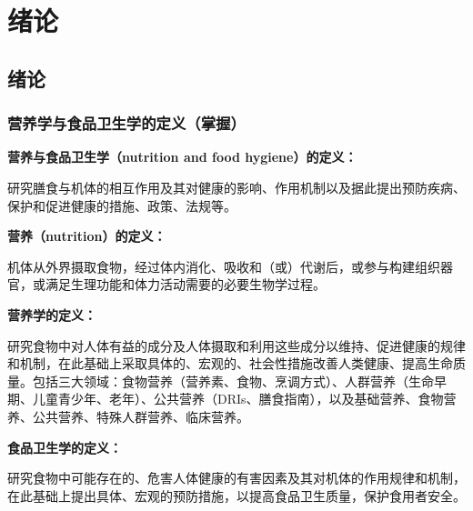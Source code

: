 \chapter{绪论}

\section{绪论}

\subsection{营养学与食品卫生学的定义（掌握）}

\begin{keybox}
\textbf{营养与食品卫生学（nutrition and food hygiene）的定义：}

研究膳食与机体的相互作用及其对健康的影响、作用机制以及据此提出预防疾病、保护和促进健康的措施、政策、法规等。
\end{keybox}

\begin{defbox}
\textbf{营养（nutrition）的定义：}

机体从外界摄取食物，经过体内消化、吸收和（或）代谢后，或参与构建组织器官，或满足生理功能和体力活动需要的必要生物学过程。
\end{defbox}

\begin{keybox}
\textbf{营养学的定义：}

研究食物中对人体有益的成分及人体摄取和利用这些成分以维持、促进健康的规律和机制，在此基础上采取具体的、宏观的、社会性措施改善人类健康、提高生命质量。包括三大领域：食物营养（营养素、食物、烹调方式）、人群营养（生命早期、儿童青少年、老年）、公共营养（DRIs、膳食指南），以及基础营养、食物营养、公共营养、特殊人群营养、临床营养。

\textbf{食品卫生学的定义：}

研究食物中可能存在的、危害人体健康的有害因素及其对机体的作用规律和机制，在此基础上提出具体、宏观的预防措施，以提高食品卫生质量，保护食用者安全。
\end{keybox}

